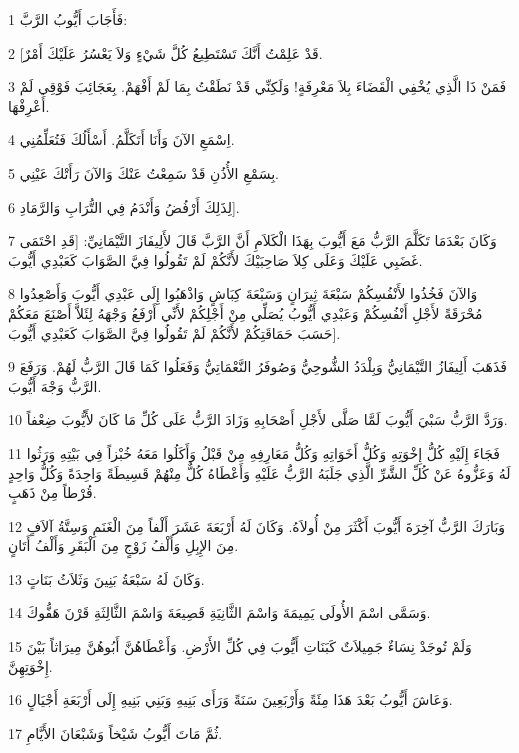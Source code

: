 \par 1 فَأَجَابَ أَيُّوبُ الرَّبَّ:
\par 2 [قَدْ عَلِمْتُ أَنَّكَ تَسْتَطِيعُ كُلَّ شَيْءٍ وَلاَ يَعْسُرُ عَلَيْكَ أَمْرٌ.
\par 3 فَمَنْ ذَا الَّذِي يُخْفِي الْقَضَاءَ بِلاَ مَعْرِفَةٍ! وَلَكِنِّي قَدْ نَطَقْتُ بِمَا لَمْ أَفْهَمْ. بِعَجَائِبَ فَوْقِي لَمْ أَعْرِفْهَا.
\par 4 اِسْمَعِ الآنَ وَأَنَا أَتَكَلَّمُ. أَسْأَلُكَ فَتُعَلِّمُنِي.
\par 5 بِسَمْعِ الأُذُنِ قَدْ سَمِعْتُ عَنْكَ وَالآنَ رَأَتْكَ عَيْنِي.
\par 6 لِذَلِكَ أَرْفُضُ وَأَنْدَمُ فِي التُّرَابِ وَالرَّمَادِ].
\par 7 وَكَانَ بَعْدَمَا تَكَلَّمَ الرَّبُّ مَعَ أَيُّوبَ بِهَذَا الْكَلاَمِ أَنَّ الرَّبَّ قَالَ لأَلِيفَازَ التَّيْمَانِيِّ: [قَدِ احْتَمَى غَضَبِي عَلَيْكَ وَعَلَى كِلاَ صَاحِبَيْكَ لأَنَّكُمْ لَمْ تَقُولُوا فِيَّ الصَّوَابَ كَعَبْدِي أَيُّوبَ.
\par 8 وَالآنَ فَخُذُوا لأَنْفُسِكُمْ سَبْعَةَ ثِيرَانٍ وَسَبْعَةَ كِبَاشٍ وَاذْهَبُوا إِلَى عَبْدِي أَيُّوبَ وَأَصْعِدُوا مُحْرَقَةً لأَجْلِ أَنْفُسِكُمْ وَعَبْدِي أَيُّوبُ يُصَلِّي مِنْ أَجْلِكُمْ لأَنِّي أَرْفَعُ وَجْهَهُ لِئَلاَّ أَصْنَعَ مَعَكُمْ حَسَبَ حَمَاقَتِكُمْ لأَنَّكُمْ لَمْ تَقُولُوا فِيَّ الصَّوَابَ كَعَبْدِي أَيُّوبَ].
\par 9 فَذَهَبَ أَلِيفَازُ التَّيْمَانِيُّ وَبِلْدَدُ الشُّوحِيُّ وَصُوفَرُ النَّعْمَاتِيُّ وَفَعَلُوا كَمَا قَالَ الرَّبُّ لَهُمْ. وَرَفَعَ الرَّبُّ وَجْهَ أَيُّوبَ.
\par 10 وَرَدَّ الرَّبُّ سَبْيَ أَيُّوبَ لَمَّا صَلَّى لأَجْلِ أَصْحَابِهِ وَزَادَ الرَّبُّ عَلَى كُلِّ مَا كَانَ لأَيُّوبَ ضِعْفاً.
\par 11 فَجَاءَ إِلَيْهِ كُلُّ إِخْوَتِهِ وَكُلُّ أَخَوَاتِهِ وَكُلُّ مَعَارِفِهِ مِنْ قَبْلُ وَأَكَلُوا مَعَهُ خُبْزاً فِي بَيْتِهِ وَرَثُوا لَهُ وَعَزُّوهُ عَنْ كُلِّ الشَّرِّ الَّذِي جَلَبَهُ الرَّبُّ عَلَيْهِ وَأَعْطَاهُ كُلٌّ مِنْهُمْ قَسِيطَةً وَاحِدَةً وَكُلُّ وَاحِدٍ قُرْطاً مِنْ ذَهَبٍ.
\par 12 وَبَارَكَ الرَّبُّ آخِرَةَ أَيُّوبَ أَكْثَرَ مِنْ أُولاَهُ. وَكَانَ لَهُ أَرْبَعَةَ عَشَرَ أَلْفاً مِنَ الْغَنَمِ وَسِتَّةُ آلاَفٍ مِنَ الإِبِلِ وَأَلْفُ زَوْجٍ مِنَ الْبَقَرِ وَأَلْفُ أَتَانٍ.
\par 13 وَكَانَ لَهُ سَبْعَةُ بَنِينَ وَثَلاَثُ بَنَاتٍ.
\par 14 وَسَمَّى اسْمَ الأُولَى يَمِيمَةَ وَاسْمَ الثَّانِيَةِ قَصِيعَةَ وَاسْمَ الثَّالِثَةِ قَرْنَ هَفُّوكَ.
\par 15 وَلَمْ تُوجَدْ نِسَاءٌ جَمِيلاَتٌ كَبَنَاتِ أَيُّوبَ فِي كُلِّ الأَرْضِ. وَأَعْطَاهُنَّ أَبُوهُنَّ مِيرَاثاً بَيْنَ إِخْوَتِهِنَّ.
\par 16 وَعَاشَ أَيُّوبُ بَعْدَ هَذَا مِئَةً وَأَرْبَعِينَ سَنَةً وَرَأَى بَنِيهِ وَبَنِي بَنِيهِ إِلَى أَرْبَعَةِ أَجْيَالٍ.
\par 17 ثُمَّ مَاتَ أَيُّوبُ شَيْخاً وَشَبْعَانَ الأَيَّامِ.

